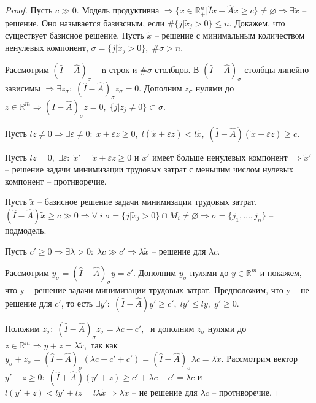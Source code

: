\begin{proof}
	Пусть $c \gg 0.$ Модель продуктивна $\Rightarrow \{ x \in \mathbb{R}_{+}^n | \hat{I}x - \hat{A}x \geq c \} \neq \varnothing \Rightarrow \exists \tilde{x}$ -- решение. Оно называется базизсным, если $\#\{j | \tilde{x}_j > 0\} \leq n.$ Докажем, что существует базисное решение. Пусть $\tilde{x}$ -- решение с минимальным количеством ненулевых компонент, $\sigma = \{j | \tilde{x}_j > 0\}, \; \#\sigma > n.$

	Рассмотрим $(\hat{I} - \hat{A})_{\sigma}$ -- n строк и $\#\sigma$ столбцов. В $(\hat{I} - \hat{A})_{\sigma}$ столбцы линейно зависимы $\Rightarrow \exists z_\sigma: \; (\hat{I} - \hat{A})_{\sigma}z_\sigma = 0.$ Дополним $z_\sigma$ нулями до $z \in \mathbb{R}^m \Rightarrow (\hat{I} - \hat{A})_{\sigma}z = 0, \; \{ j | z_j \neq 0\} \subset \sigma.$ 

	Пусть $lz \neq 0 \Rightarrow \exists \varepsilon \neq 0: \; \tilde{x} + \varepsilon z \geq 0, \; l(\tilde{x} + \varepsilon z) < l \tilde{x}, \; (\hat{I} - \hat{A})(\tilde{x} + \varepsilon z ) \geq c.$

	Пусть $ lz = 0, \; \exists \varepsilon: \;  \tilde{x}' = \tilde{x} + \varepsilon z \geq 0$ и $\tilde{x}'$ имеет больше ненулевых компонент $\Rightarrow \tilde{x}'$ -- решение задачи минимизации трудовых затрат с меньшим числом нулевых компонент -- противоречие.

	Пусть $\tilde{x}$ -- базисное решение задачи минимизации трудовых затрат. $(\hat{I} - \hat{A})\tilde{x} \geq c \gg 0 \Rightarrow \forall \; i \; \sigma = \{j | \tilde{x}_j > 0\} \cap M_i \neq \varnothing \Rightarrow \sigma = \{j_1, \ldots, j_n \}$ -- подмодель.

	Пусть $c' \geq 0 \Rightarrow \exists \lambda > 0: \; \lambda c \gg c' \Rightarrow \lambda \tilde{x}$ -- решение для $\lambda c$.

	Рассмотрим $y_\sigma = (\hat{I} - \hat{A})_{\sigma} y = c'$. Дополним $y_\sigma$ нулями до $y \in \mathbb{R}^m $ и покажем, что y -- решение задачи минимизации трудовых затрат. Предположим, что y -- не решение для $c'$, то есть $\exists y': \; (\hat{I} - \hat{A})y' \geq c', \; ly' \leq ly, \; y' \geq 0.$

	Положим $z_\sigma: \; (\hat{I} - \hat{A})_{\sigma}z_\sigma = \lambda c - c', \; $ и дополним $z_\sigma$ нулями до $z \in \mathbb{R}^m \Rightarrow y + z = \lambda \tilde{x}, $ так как $y_\sigma + z_\sigma = (\hat{I} - \hat{A})_{\sigma}(\lambda c - c' + c') = (\hat{I} - \hat{A})_{\sigma}\lambda c = \lambda \tilde{x}$. Рассмотрим вектор $y' + z \geq 0: \; (\hat{I}  + \hat{A})(y' + z) \geq c' + \lambda c - c' = \lambda c $ и $l(y' + z) < ly' + lz = l \lambda \tilde{x} \Rightarrow \lambda \tilde{x}$ -- не решение для $\lambda c$ -- противоречие.
\end{proof}